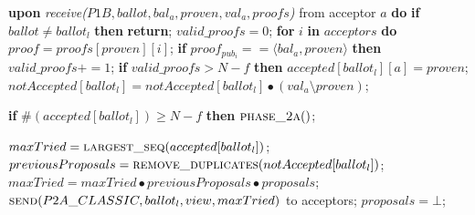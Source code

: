 \begin{algorithm}
\begin{algorithmic}[1]
		\State
		\State \textbf{upon} \textit{receive($P1B, ballot, bal_a, proven,val_a, proofs$)} from acceptor $a$ \textbf{do}
		\State \hspace{\algorithmicindent} \textbf{if} $ballot \neq ballot_l$ \textbf{then}
		\State \hspace{\algorithmicindent}\hspace{\algorithmicindent} \textbf{return};
		\State
		\State \hspace{\algorithmicindent} $valid\_proofs = 0$; 
		\State \hspace{\algorithmicindent} \textbf{for} $i$ \textbf{in} $acceptors$ \textbf{do}
		\State \hspace{\algorithmicindent}\hspace{\algorithmicindent} $proof = proofs[proven][i]$;
		\State \hspace{\algorithmicindent}\hspace{\algorithmicindent} \textbf{if} $proof_{pub_i} == \langle bal_a, proven \rangle$ \textbf{then}
		\State \hspace{\algorithmicindent}\hspace{\algorithmicindent}\hspace{\algorithmicindent} 
		$valid\_proofs \mathrel{+{=}} 1$;
		\State
		\State \hspace{\algorithmicindent} \textbf{if} $valid\_proofs > N-f$ \textbf{then}
		\State \hspace{\algorithmicindent}\hspace{\algorithmicindent}\hspace{\algorithmicindent} $accepted[ballot_l][a] = proven$;
		\State \hspace{\algorithmicindent}\hspace{\algorithmicindent}\hspace{\algorithmicindent}		$notAccepted[ballot_l] = notAccepted[ballot_l] \bullet (val_a \setminus proven)$;		
		
		\State 
		\State \hspace{\algorithmicindent}\hspace{\algorithmicindent} \textbf{if} $\#(accepted[ballot_l]) \geq N-f$ \textbf{then} 
		\State \hspace{\algorithmicindent}\hspace{\algorithmicindent}\hspace{\algorithmicindent} $\Call{phase\_2a}{ }$;
		
		\State
		\State $maxTried = \Call{largest\_seq}{accepted[ballot_l]}$;
		\State $previousProposals = \Call{remove\_duplicates}{notAccepted[ballot_l]}$;
		\State $maxTried = maxTried \bullet previousProposals \bullet proposals$;
		\State $\Call{send}{P2A\_CLASSIC,ballot_l,view, maxTried}$ to acceptors;
		\State $proposals = \bot$;
		\EndFunction
		
	\end{algorithmic}
\end{algorithm}

